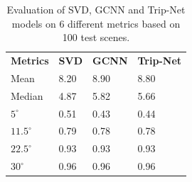 \documentclass[border=15pt, multi, tikz]{article}
\newcommand{\tabhead}[1]{\textbf{#1}}
\begin{document}
\begin{table}[H]
	\centering
	\begin{tabular}{l l l l }
		\tabhead{Metrics} & \tabhead{SVD} & \tabhead{GCNN} & \tabhead{Trip-Net} \\
		Mean  					& 8.20 & 8.90 & 8.80\\ 
		\hline
		Median					& 4.87 & 5.82 & 5.66 \\ 
		\hline
		$ 5^\circ $ 			& 0.51 & 0.43 & 0.44 \\
		\hline
		$ 11.5^\circ $ 			& 0.79 & 0.78 & 0.78 \\
		\hline
		$ 22.5^\circ $ 			& 0.93 & 0.93 & 0.93 \\
		\hline
		$ 30^\circ $ 			& 0.96 & 0.96 & 0.96\\
	\end{tabular}
	\caption{Evaluation of SVD, GCNN and Trip-Net models on 6 different metrics based on 100 test scenes.}	
	\label{tab:high_resolution_eval}
\end{table}
\end{document}
